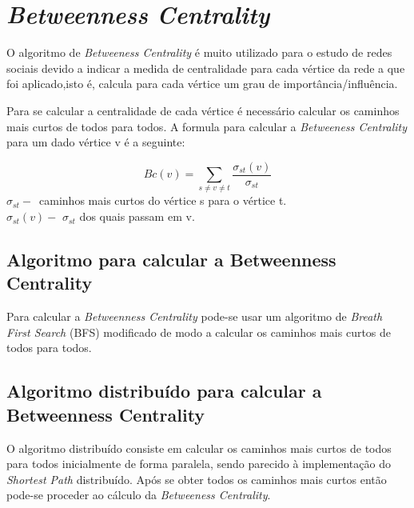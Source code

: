 \section{\textit{Betweenness Centrality}}

O algoritmo de \textit{Betweeness Centrality} é muito utilizado para o estudo 
de 
redes sociais devido a indicar a medida de centralidade para cada vértice da 
rede a que foi aplicado,isto é, calcula para cada vértice um grau de 
importância/influência. 

Para se calcular a centralidade de cada vértice é necessário calcular os 
caminhos mais curtos de todos para todos. A formula para calcular a 
\textit{Betweeness Centrality} para um dado vértice v é a seguinte:
\begin{center}
	\begin{equation}
		Bc(v) = \sum\limits_{s \neq v \neq t} 
\frac{\sigma_{st}(v)}{\sigma_{st}}
		\label{eq:bc}
	\end{equation}
	$\sigma_{st}-$~caminhos mais curtos do vértice s para o vértice t.\\
	$\sigma_{st}(v)-$ $\sigma_{st}$ dos quais passam em v.\\
\end{center}

\subsection{Algoritmo para calcular a Betweenness Centrality}
Para calcular a \textit{Betweenness Centrality} pode-se usar um algoritmo de 
\textit{Breath First Search} (BFS) modificado de modo a calcular os caminhos 
mais curtos de todos para todos. 

\subsection{Algoritmo distribuído para calcular a Betweenness Centrality}
O algoritmo distribuído consiste em calcular os caminhos mais curtos de todos 
para todos inicialmente de forma paralela, sendo parecido à implementação do 
\textit{Shortest Path} distribuído. Após se obter todos os caminhos mais curtos 
então pode-se proceder ao cálculo da \textit{Betweeness Centrality}. 

